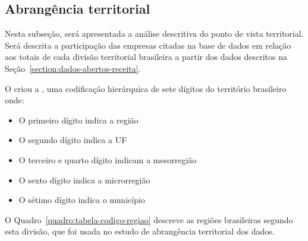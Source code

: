\subsection{Abrangência territorial}

Nesta subseção, será apresentada a análise descritiva do ponto de vista territorial. Será descrita a participação das empresas citadas na base de dados em relação aos totais de cada divisão territorial brasileira a partir dos dados descritos na Seção~\ref{section:dados-abertos-receita}.

O  criou a , uma codificação hierárquica de sete dígitos do território brasileiro onde:

\begin{itemize}
    \item O primeiro dígito indica a região
    \item O segundo dígito indica a UF
    \item O terceiro e quarto dígito indicam a mesorregião
    \item O sexto dígito indica a microrregião
    \item O sétimo dígito indica o município
\end{itemize}

O Quadro~\ref{quadro:tabela-codigo-regiao} descreve as regiões brasileiras segundo esta divisão, que foi usada no estudo de abrangência territorial dos dados.

